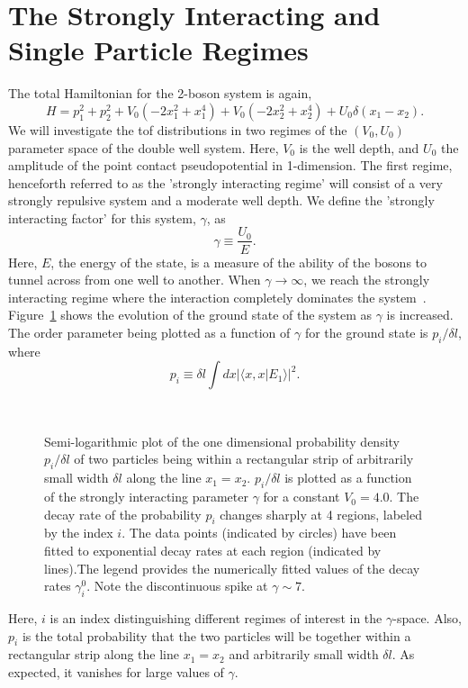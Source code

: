 \section{\label{sec:1:appendixtof} The Strongly Interacting and Single Particle Regimes} 
%
%
The total Hamiltonian for the 2-boson system is again,
\begin{equation}
H =p^2_1+p^2_2+V_0 (-2 x_1^2+ x_1^4) +V_0 (-2 x_2^2+ x_2^4)+U_0 \delta(x_1-x_2) .
\label{eq:hamscale:appendixtof}
\end{equation}
We will investigate the tof distributions in two regimes of the $\left(V_0,U_0\right)$ parameter space of the double well system. Here, $V_0$ is the well depth, and $U_0$ the amplitude of the point contact pseudopotential in 1-dimension.
The first regime, henceforth referred to as the 'strongly interacting regime' will consist of a very strongly repulsive system and a moderate well depth. We define the 'strongly interacting factor' for this system, $\gamma$, as 
\begin{equation}
\gamma \equiv \frac{U_0}{E}.
\end{equation}
Here, $E$, the energy of the state, is a measure of the ability of the bosons to tunnel across from one well to another. When $\gamma \rightarrow \infty$, we reach the strongly interacting regime where the interaction completely dominates the system~\cite{tonks:gas}. Figure~\ref{fig:tonksparam:appendixtof} shows the evolution of the ground state of the system as $\gamma$ is increased. The order parameter being plotted as a function of $\gamma$ for the ground state is $p_i/{\delta l}$, where 
\begin{equation}
p_i \equiv \delta l \int dx| \langle x , x | E_1 \rangle |^2.
\end{equation}

\begin{figure}
\hspace*{-0.2in}
\ 
\caption{Semi-logarithmic plot of the one dimensional probability density $p_i/{\delta l}$ of two particles being within a rectangular strip of arbitrarily small width $\delta l$ along the line $x_1=x_2$. $p_i/{\delta l}$ is plotted as a function of the strongly interacting parameter $\gamma$ for a constant $V_0=4.0$. The decay rate of the probability $p_i$ changes sharply at 4 regions, labeled by the index $i$. The data points (indicated by circles) have been fitted to exponential decay rates at each region (indicated by lines).The legend provides the numerically fitted values of the decay rates $\gamma^0_i$. Note the discontinuous spike at $\gamma\sim 7$.}
\label{fig:tonksparam:appendixtof}
\end{figure}
Here, $i$ is an index distinguishing different regimes of interest in the $\gamma$-space. Also, $p_i$ is the total probability that the two particles will be together within a rectangular strip along the line $x_1=x_2$ and arbitrarily small width $\delta l$. As expected, it vanishes for large values of $\gamma$.

